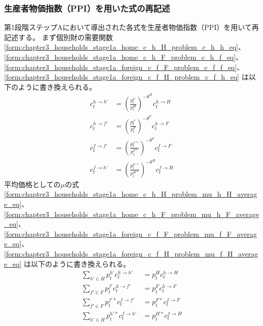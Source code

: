 \subsubsection{生産者物価指数（PPI）を用いた式の再記述}
\label{sec:chapter3_households_stage1a_ppi_descriptions}
第1段階ステップAにおいて導出された各式を生産者物価指数（PPI）を用いて再記述する。
まず個別財の需要関数
\eqref{form:chapter3_households_stage1a_home_c_h_H_problem_c_h_h_eq}、
\eqref{form:chapter3_households_stage1a_home_c_h_F_problem_c_h_f_eq}、
\eqref{form:chapter3_households_stage1a_foreign_c_f_F_problem_c_f_f_eq}、
\eqref{form:chapter3_households_stage1a_foreign_c_f_H_problem_c_f_h_eq}
は以下のように書き換えられる。
\begin{align}
    \label{form:chapter3_households_stage1a_ppi_descriptions_c_h_h_eq}
        c_t^{h\to h'}&=\left(\frac{p_t^{h'}}{p_t^H}\right)^{-\theta^H}c_t^{h\to H} \\
    \label{form:chapter3_households_stage1a_ppi_descriptions_c_h_f_eq}
        c_t^{h\to f'}&=\left(\frac{p_t^{f'}}{p_t^F}\right)^{-\theta^F}c_t^{h\to F} \\
    \label{form:chapter3_households_stage1a_ppi_descriptions_c_f_f_eq}
        c_t^{f\to f'}&=\left(\frac{p_t^{f'*}}{p_t^{F*}}\right)^{-\theta^F}c_t^{f\to F} \\
    \label{form:chapter3_households_stage1a_ppi_descriptions_c_f_h_eq}
        c_t^{f\to h'}&=\left(\frac{p_t^{h'*}}{p_t^{H*}}\right)^{-\theta^H}c_t^{f\to H}
\end{align}
平均価格としての\(\mu\)の式
\eqref{form:chapter3_households_stage1a_home_c_h_H_problem_mu_h_H_average_eq}、
\eqref{form:chapter3_households_stage1a_home_c_h_F_problem_mu_h_F_average_eq}、
\eqref{form:chapter3_households_stage1a_foreign_c_f_F_problem_mu_f_F_average_eq}、
\eqref{form:chapter3_households_stage1a_foreign_c_f_H_problem_mu_f_H_average_eq}
は以下のように書き換えられる。
\begin{align}
    \label{form:chapter3_households_stage1a_ppi_descriptions_p_H_average_eq}
        \sum_{h'\in H}p_t^{h'}c_t^{h\to h'}&=p_t^Hc_t^{h\to H} \\
    \label{form:chapter3_households_stage1a_ppi_descriptions_p_F_average_eq}
        \sum_{f'\in F}p_t^{f'}c_t^{h\to f'}&=p_t^Fc_t^{h\to F} \\
    \label{form:chapter3_households_stage1a_ppi_descriptions_p_F_star_average_eq}
        \sum_{f'\in F}p_t^{f'*}c_t^{f\to f'}&=p_t^{F*}c_t^{f\to F} \\
    \label{form:chapter3_households_stage1a_ppi_descriptions_p_H_star_average_eq}
        \sum_{h'\in H}p_t^{h'*}c_t^{f\to h'}&=p_t^{H*}c_t^{f\to H}
\end{align}
